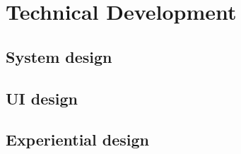 \chapter{Technical Development}



\section{System design}



\section{UI design}



\section{Experiential design}

